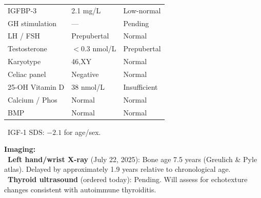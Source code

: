 \documentclass[11pt,a4paper]{article}
\begin{document}
\begin{tcolorbox}[pednote, title={\faFlask\enspace Investigations}]
\begin{minipage}[t]{0.48\linewidth}
\begin{tabular}{@{} l l l @{}}
    IGFBP-3           & 2.1 mg/L          & Low-normal   \\
    GH stimulation    & ---               & Pending      \\
    LH / FSH          & Prepubertal       & Normal       \\
    Testosterone      & $<$0.3 nmol/L     & Prepubertal  \\
    Karyotype         & 46,XY             & Normal       \\
    Celiac panel      & Negative          & Normal       \\
    25-OH Vitamin D   & 38 nmol/L         & Insufficient \\
    Calcium / Phos    & Normal            & Normal       \\
    BMP               & Normal            & Normal       \\
    \bottomrule
  \end{tabular}
  {\footnotesize\color{WarnBorder}\dag\ IGF-1 SDS: $-2.1$ for age/sex.}

  \medskip
  \textbf{\color{PedBlue}Imaging:}\\[2pt]
  {\small
  \faXRay\ \textbf{Left hand/wrist X-ray} (July 22, 2025): Bone age 7.5 years
  (Greulich \& Pyle atlas). Delayed by approximately 1.9 years
  relative to chronological age.\\[3pt]
  \faMicroscope\ \textbf{Thyroid ultrasound} (ordered today): Pending.
  Will assess for echotexture changes consistent with autoimmune thyroiditis.
  }
\end{minipage}

\end{tcolorbox}

\vspace{4mm}
\end{document}
